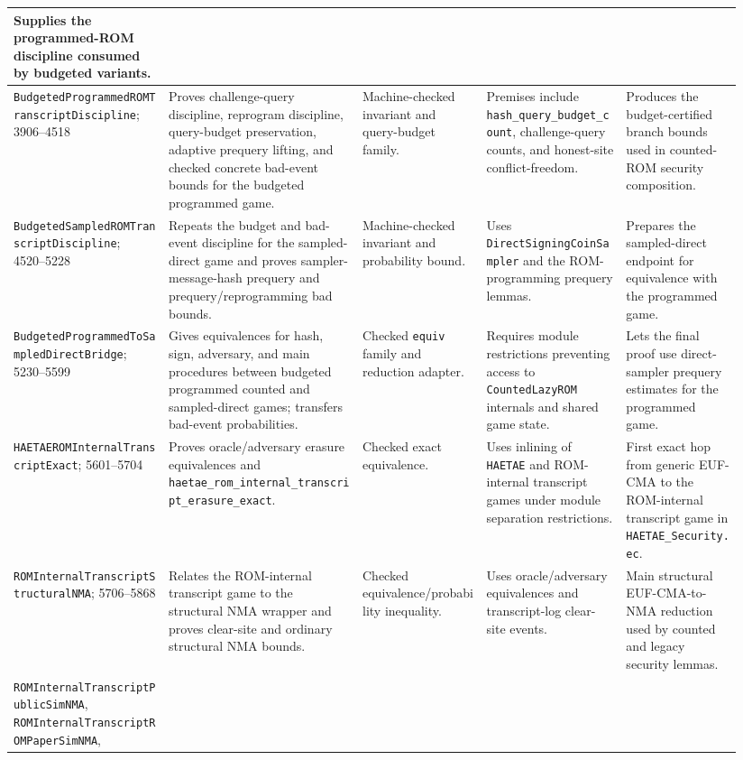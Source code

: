 \documentclass[11pt]{report}
\DeclareRobustCommand{\file}[1]{\ifmmode\text{\nolinkurl{#1}}\else\nolinkurl{#1}\fi}
\DeclareRobustCommand{\ec}[1]{\ifmmode\text{\nolinkurl{#1}}\else\nolinkurl{#1}\fi}
\theoremstyle{definition}
\theoremstyle{plain}
\begin{document}
{\begin{longtable}{p{0.20\linewidth}p{0.25\linewidth}p{0.16\linewidth}p{0.18\linewidth}p{0.15\linewidth}}
Supplies the programmed-ROM discipline consumed by budgeted variants. \\
\midrule
\ec{BudgetedProgrammedROMTranscriptDiscipline}; 3906--4518 &
Proves challenge-query discipline, reprogram discipline, query-budget
preservation, adaptive prequery lifting, and checked concrete bad-event bounds
for the budgeted programmed game. &
Machine-checked invariant and query-budget family. &
Premises include \ec{hash\_query\_budget\_count}, challenge-query counts, and
honest-site conflict-freedom. &
Produces the budget-certified branch bounds used in counted-ROM security
composition. \\
\midrule
\ec{BudgetedSampledROMTranscriptDiscipline}; 4520--5228 &
Repeats the budget and bad-event discipline for the sampled-direct game and
proves sampler-message-hash prequery and prequery/reprogramming bad bounds. &
Machine-checked invariant and probability bound. &
Uses \ec{DirectSigningCoinSampler} and the ROM-programming prequery lemmas. &
Prepares the sampled-direct endpoint for equivalence with the programmed game. \\
\midrule
\ec{BudgetedProgrammedToSampledDirectBridge}; 5230--5599 &
Gives equivalences for hash, sign, adversary, and main procedures between
budgeted programmed counted and sampled-direct games; transfers bad-event
probabilities. &
Checked \ec{equiv} family and reduction adapter. &
Requires module restrictions preventing access to \ec{CountedLazyROM} internals
and shared game state. &
Lets the final proof use direct-sampler prequery estimates for the programmed
game. \\
\midrule
\ec{HAETAEROMInternalTranscriptExact}; 5601--5704 &
Proves oracle/adversary erasure equivalences and
\ec{haetae\_rom\_internal\_transcript\_erasure\_exact}. &
Checked exact equivalence. &
Uses inlining of \ec{HAETAE} and ROM-internal transcript games under module
separation restrictions. &
First exact hop from generic EUF-CMA to the ROM-internal transcript game in
\file{HAETAE\_Security.ec}. \\
\midrule
\ec{ROMInternalTranscriptStructuralNMA}; 5706--5868 &
Relates the ROM-internal transcript game to the structural NMA wrapper and
proves clear-site and ordinary structural NMA bounds. &
Checked equivalence/probability inequality. &
Uses oracle/adversary equivalences and transcript-log clear-site events. &
Main structural EUF-CMA-to-NMA reduction used by counted and legacy security
lemmas. \\
\midrule
\ec{ROMInternalTranscriptPublicSimNMA},
\ec{ROMInternalTranscriptROMPaperSimNMA},

\end{longtable}}
\end{document}
